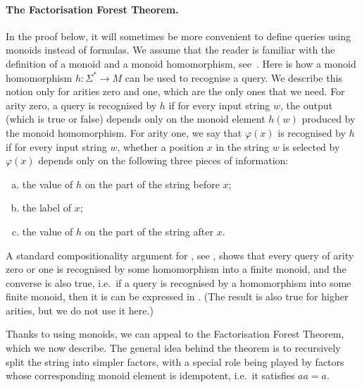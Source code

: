 \paragraph*{The Factorisation Forest Theorem.} In the proof below, it will sometimes be more convenient to define queries using monoids instead of \mso formulas. We assume that the reader is familiar with the definition of a monoid and  a monoid homomorphism, see~\cite[Section 1]{bojanczyk_recobook}. Here is how a monoid homomorphism $h : \Sigma^* \to M$ can be used to recognise a query. We describe this notion only for arities zero and one, which are the only ones that we need. For arity zero, a query  is recognised
 by $h$  if for every input string $w$, the output (which is true or false) depends only on the monoid element $h(w)$ produced by the  monoid homomorphism. For arity one, we say that  $\varphi(x)$ is recognised by $h$ 
    if for every input string $w$,  whether a position $x$ in the  string $w$ is selected by $\varphi(x)$ depends only on the following three pieces of information: 
    \begin{enumerate}[(a)]
        \item the value of $h$ on the part of the string before $x$;
        \item the label of $x$;
        \item the value of $h$ on the part of the string after $x$.
    \end{enumerate}
    A standard compositionality argument for \mso, see \cite[Section 2.1]{bojanczyk_recobook}, shows that every \mso query of arity zero or one is recognised by some homomorphism into a finite monoid,  and the converse is also true, i.e.~if a query is recognised by a homomorphism into some finite monoid, then it is can be expressed in \mso. (The result is also true for higher arities, but we do not use it here.)

    Thanks to using monoids, we can appeal to the  Factorisation Forest Theorem, which we now describe. The general idea behind the theorem is to recursively split the string into simpler factors, with a special role being played by factors whose corresponding monoid element is idempotent, i.e.~it satisfies $aa=a$.  
    

